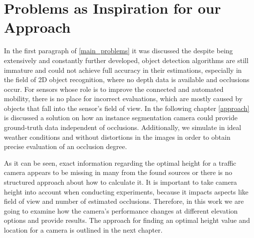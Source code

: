 \section{Problems as Inspiration for our Approach}
In the first paragraph of \ref{main_problems} it was discussed the despite being extensively and constantly further developed, object detection algorithms are still immature and could not achieve full accuracy in their estimations, especially in the field of 2D object recognition, where no depth data is available and occlusions occur. For sensors whose role is to improve the connected and automated mobility, there is no place for incorrect evaluations, which are mostly caused by objects that fall into the sensor's field of view. In the following chapter \ref{approach} is discussed a solution on how an instance segmentation camera could provide ground-truth data independent of occlusions. Additionally, we simulate in ideal weather conditions and without distortions in the images in order to obtain precise evaluation of an occlusion degree.

As it can be seen, exact information regarding the optimal height for a traffic camera appears to be missing in many from the found sources or there is no structured approach about how to calculate it. It is important to take camera height into account when conducting experiments, because it impacts aspects like field of view and number of estimated occlusions. Therefore, in this work we are going to examine how the camera's performance changes at different elevation options and provide results. The approach for finding an optimal height value and location for a camera is outlined in the next chapter.

